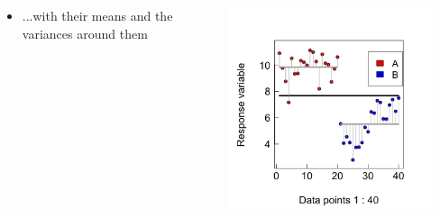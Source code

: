 \documentclass{beamer}
\begin{document}
\begin{frame}{}
  \begin{columns}[onlytextwidth] %
    \begin{column}{0.44\textwidth}
  \begin{itemize}
    \item ...with their means and the variances around them
  \end{itemize}
    \end{column}
    \hspace{0.02\textwidth} %
    \begin{column}{0.6\textwidth}
      \begin{center}
        \includegraphics[width=0.9\textwidth]{lectures/day_1_intro_to_mems/figures/unnamed-chunk-22-1.png}
      \end{center}
    \end{column}
  \end{columns}
\end{frame}
\end{document}
